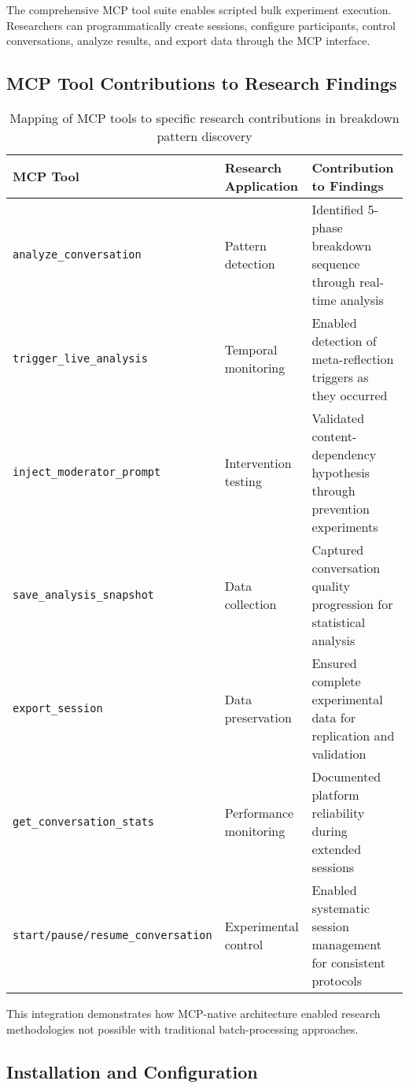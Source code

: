\documentclass[11pt,letterpaper]{article}
\begin{document}
The comprehensive MCP tool suite enables scripted bulk experiment execution. Researchers can programmatically create sessions, configure participants, control conversations, analyze results, and export data through the MCP interface. \subsection{MCP Tool Contributions to Research Findings}

\begin{table}[h]
\centering
\begin{tabular}{p{4cm}p{4cm}p{6cm}}
\toprule
\textbf{MCP Tool} & \textbf{Research Application} & \textbf{Contribution to Findings} \\
\midrule
\texttt{analyze\_conversation} & Pattern detection & Identified 5-phase breakdown sequence through real-time analysis \\
\texttt{trigger\_live\_analysis} & Temporal monitoring & Enabled detection of meta-reflection triggers as they occurred \\
\texttt{inject\_moderator\_prompt} & Intervention testing & Validated content-dependency hypothesis through prevention experiments \\
\texttt{save\_analysis\_snapshot} & Data collection & Captured conversation quality progression for statistical analysis \\
\texttt{export\_session} & Data preservation & Ensured complete experimental data for replication and validation \\
\texttt{get\_conversation\_stats} & Performance monitoring & Documented platform reliability during extended sessions \\
\texttt{start/pause/resume\_conversation} & Experimental control & Enabled systematic session management for consistent protocols \\
\bottomrule
\end{tabular}
\caption{Mapping of MCP tools to specific research contributions in breakdown pattern discovery}
\label{tab:mcp_contributions}
\end{table}

This integration demonstrates how MCP-native architecture enabled research methodologies not possible with traditional batch-processing approaches.

\subsection{Installation and Configuration}
\end{document}
